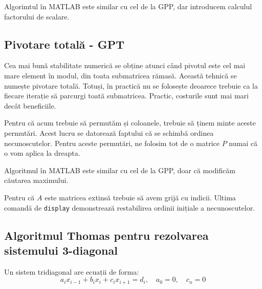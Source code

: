 \documentclass{exam}
\newcommand{\octavescript}[2]{
	
}
\begin{document}
\par Algorimtul în MATLAB este similar cu cel de la GPP, dar introducem
calculul factorului de scalare.

\octavescript{./src/GPPS.m}{}

\subsection{Pivotare totală - GPT}

\par Cea mai bună stabilitate numerică se obține atunci când pivotul este cel
mai mare element în modul, din toata submatricea rămasă. Această tehnică se
numește pivotare totală. Totuși, în practică nu se folosește deoarece trebuie
ca la fiecare iterație să parcurgi toată submatricea. Practic, costurile
sunt mai mari decât beneficiile.

\par Pentru că acum trebuie să permutăm și coloanele, trebuie să ținem minte
aceste permutări. Acest lucru se datorează faptului că se schimbă ordinea
necunoscutelor. Pentru aceste permutări, ne folosim tot de o matrice $P$ numai
că o vom aplica la dreapta.

\par Algoritmul în MATLAB este similar cu cel de la GPP, doar că modificăm
căutarea maximului.

\octavescript{./src/GPT.m}{}

\par Pentru că $A$ este matricea extinsă trebuie să avem grijă cu indicii.
Ultima comandă de \verb|display| demonstrează restabilirea ordinii inițiale a
necunoscutelor.

\subsection{Algoritmul Thomas pentru rezolvarea sistemului 3-diagonal}

Un sistem tridiagonal are ecuații de forma:
\begin{equation*}
	a_i x_{i - 1} + b_i x_i + c_i x_{i + 1} = d_i, \quad a_0 = 0, \quad c_n = 0
\end{equation*}
\end{document}
